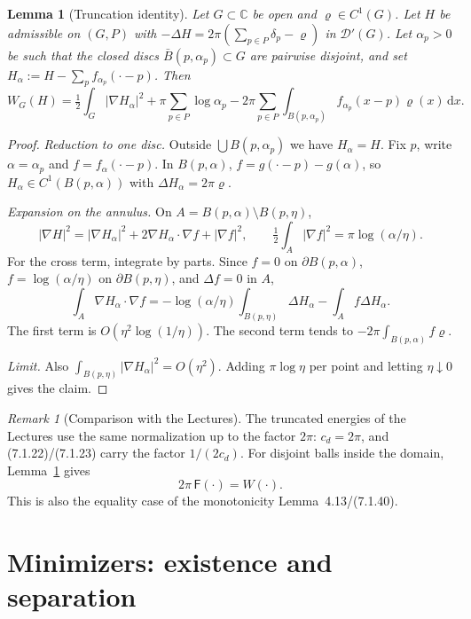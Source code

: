 \documentclass[11pt]{article}
\newtheorem{lemma}[theorem]{Lemma}
\theoremstyle{definition}
\theoremstyle{remark}
\newtheorem{remark}[theorem]{Remark}
\newcommand{\C}{\mathbb C}
\newcommand{\dd}{\,\mathrm d}
\begin{document}
\begin{lemma}[Truncation identity]\label{lem:truncation}
Let $G\subset\C$ be open and $\varrho\in C^1(G)$. Let $H$ be admissible on $(G,P)$ with
$-\Delta H=2\pi(\sum_{p\in P}\delta_p-\varrho)$ in $\mathcal D'(G)$. Let $\alpha_p>0$ be such that
the closed discs $\bar B(p,\alpha_p)\subset G$ are pairwise disjoint, and set
$H_\alpha:=H-\sum_pf_{\alpha_p}(\cdot-p)$. Then
\[
W_G(H)=\tfrac12\int_G|\nabla H_\alpha|^2+\pi\sum_{p\in P}\log\alpha_p
-2\pi\sum_{p\in P}\int_{B(p,\alpha_p)}f_{\alpha_p}(x-p)\varrho(x)\dd x .
\]
\end{lemma}
\begin{proof}
\emph{Reduction to one disc.} Outside $\bigcup B(p,\alpha_p)$ we have $H_\alpha=H$. Fix $p$, write
$\alpha=\alpha_p$ and $f=f_\alpha(\cdot-p)$. In $B(p,\alpha)$, $f=g(\cdot-p)-g(\alpha)$, so
$H_\alpha\in C^1(B(p,\alpha))$ with $\Delta H_\alpha=2\pi\varrho$.

\emph{Expansion on the annulus.} On $A=B(p,\alpha)\setminus B(p,\eta)$,
\[
|\nabla H|^2=|\nabla H_\alpha|^2+2\nabla H_\alpha\!\cdot\!\nabla f+|\nabla f|^2,
\qquad
\tfrac12\int_A|\nabla f|^2=\pi\log(\alpha/\eta).
\]
For the cross term, integrate by parts. Since $f=0$ on $\partial B(p,\alpha)$, $f=\log(\alpha/\eta)$
on $\partial B(p,\eta)$, and $\Delta f=0$ in $A$,
\[
\int_A\nabla H_\alpha\!\cdot\!\nabla f
=-\log(\alpha/\eta)\int_{B(p,\eta)}\Delta H_\alpha-\int_Af\Delta H_\alpha .
\]
The first term is $O(\eta^2\log(1/\eta))$. The second term tends to
$-2\pi\int_{B(p,\alpha)}f\varrho$.

\emph{Limit.} Also $\int_{B(p,\eta)}|\nabla H_\alpha|^2=O(\eta^2)$. Adding $\pi\log\eta$ per point
and letting $\eta\downarrow0$ gives the claim.
\end{proof}

\begin{remark}[Comparison with the Lectures]\label{rem:book-F}
The truncated energies of the Lectures use the same normalization up to the factor $2\pi$:
$c_d=2\pi$, and (7.1.22)/(7.1.23) carry the factor $1/(2c_d)$. For
disjoint balls inside the domain, Lemma~\ref{lem:truncation} gives
\[
2\pi\,\mathsf F(\cdot)=W(\cdot).
\]
This is also the equality case of the monotonicity Lemma~4.13/(7.1.40).
\end{remark}

\section{Minimizers: existence and separation}\label{sec:separation}
\end{document}
